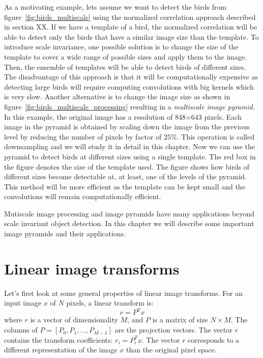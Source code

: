 As a motivating example, lets assume we want to detect the birds from figure~\ref{fig:birds_multiscale} using the normalized correlation approach described in section XX. If we have a template of a bird, the normalized correlation will be able to detect only the birds that have a similar image size than the template. To introduce scale invariance, one possible solution is to change the size of the template to cover a wide range of possible sizes and apply them to the image. Then, the ensemble of templates will be able to detect birds of different sizes. The disadvantage of this approach is that it will be computationally expensive as detecting large birds will require computing convolutions with big kernels which is very slow. Another alternative is to change the image size as shown in figure~\ref{fig:birds_multiscale_processing} resulting in a {\em multiscale image pyramid}. In this example, the original image has a resolution of 848$\times$643 pixels. Each image in the pyramid is obtained by scaling down the image from the previous level by reducing the number of pixels by factor of $25\%$. This operation is called downsampling and we will study it in detail in this chapter. Now we can use the pyramid to detect birds at different sizes using a single template. The red box in the figure denotes the size of the template used. The figure shows how birds of different sizes become detectable at, at least, one of the levels of the pyramid. This method will be more efficient as the template can be kept small and the convolutions will remain computationally efficient. 

Mutiscale image processing and image pyramids have many applications beyond scale invariant object detection. In this chapter we will describe some important image pyramids and their applications. 


\section{Linear image transforms}

Let's first look at some general properties of linear image transforms.  For an input image $x$ of $N$ pixels, a linear transform is:
\begin{equation}
r = P^T x 
\end{equation}
where $r$ is a vector of dimensionality $M$, and $P$ is  a matrix of size $N \times M$. The columns of $P = \left[P_0,  P_1, ...,P_{M-1}\right]$ are the projection vectors. The vector $r$ contains the transform coefficients: $r_i = P_i^T x$.  The vector $r$ corresponds to a different representation of the image $x$ than the original pixel space. 

